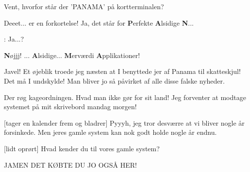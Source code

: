 \documentclass[a4paper,11pt]{article}
\begin{document}
\begin{sketch}
 Vent, hvorfor står der 'PANAMA' på kortterminalen?

 Deeet... er en forkortelse!  Ja, det står for \textbf{P}erfekte
\textbf{A}lsidige \textbf{N}... 

: Ja...?

 \textbf{N}øjjj!  ... \textbf{A}lsidige... \textbf{M}erværdi
\textbf{A}pplikationer!

 Javel!  Et øjeblik troede jeg næsten at I benyttede jer af Panama til
skatteskjul!  Det må I undskylde!  Man bliver jo så påvirket af alle disse
falske nyheder.


 Der røg kageordningen.  Hvad man ikke gør for sit land!  Jeg forventer
at modtage systemet på mit skrivebord mandag morgen!

[tager en kalender frem og bladrer] Pyyyh, jeg tror desværre at vi
bliver nogle år forsinkede.  Men jeres gamle system kan nok godt holde nogle år
endnu.

[lidt oprørt] Hvad kender du til vores gamle system?

 JAMEN DET KØBTE DU JO OGSÅ HER!



\end{sketch}
\end{document}
